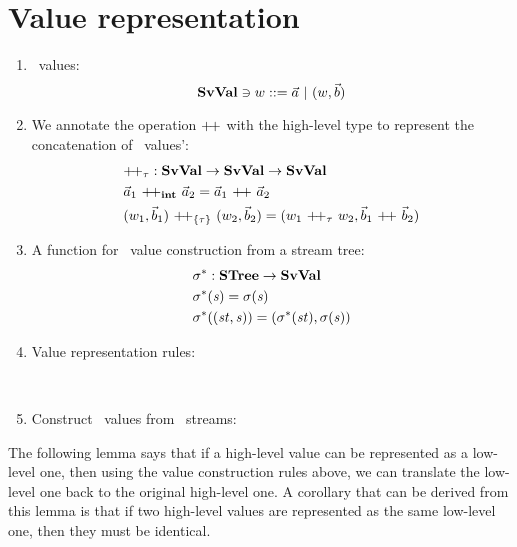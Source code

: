 \section{Value representation}
\begin{enumerate}[(1)]
	\item \fmsvcode \  values: $$\SvVal \ni \v ::= \a \ | \ (\v,\b) $$
	
	\item We annotate the operation ${\++}$ with the high-level type to represent the concatenation of \fmsvcode \  values': 
	\begin{align*}
	&{\++}_{\tau}: \SvVal \->  \SvVal \-> \SvVal \\
	& \a_1 \ {\++}_{\int}  \ \a_2 = \a_1 \ {\++} \ \a_2 \\
	&{(w_1,\b_1)} \ {\++}_{\{\tau\}} \  {(w_2,\b_2)} = ({w_1} \ {\++}_{\tau} \ {w_2}, {\b_1} \ {\++} \ {\b_2})
	\end{align*}
	
	\item A function for \fmsvcode \  value construction from a stream tree:
	\begin{align*}
	&\sgm^* : \STree \-> \SvVal \\
	&\sgm^*(\s) = \sgm(\s) \\
	&\sgm^*((\st,\s)) = (\sgm^*(\st), \sgm(\s)) 
	\end{align*}

\item Value representation rules:
	
		
		\\



\item Construct \fmsnesl \ values from \fmsvcode \ streams:

\end{enumerate}


The following lemma says that if a high-level value can be represented as a low-level one, then using the value construction rules above, we can translate the low-level one back to the original high-level one.
A corollary that can be derived from this lemma is that if two high-level values are represented as the same low-level one, then they must be identical.

